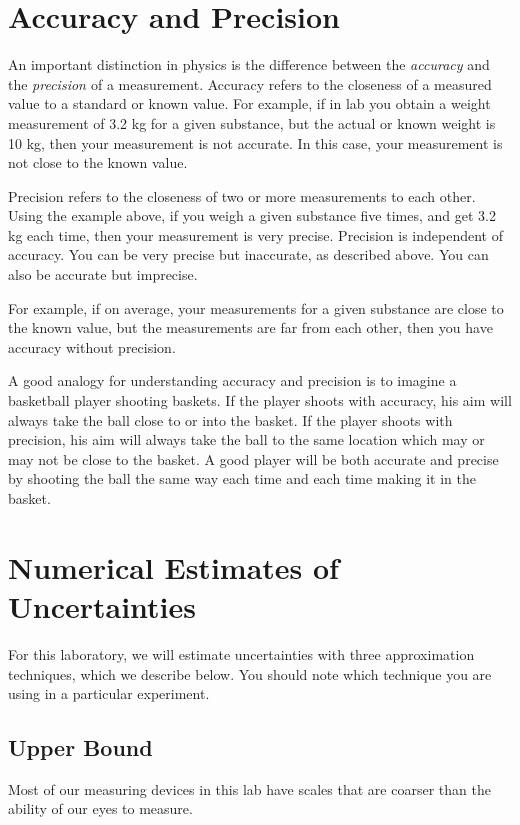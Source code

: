 \documentclass[letterpaper, 12pt]{book}
\newcommand{\myskip}{\vspace{0.5\baselineskip}}
\begin{document}
\section{Accuracy and Precision}
An important distinction in physics is the difference between the {\it{accuracy}} and the {\it{precision }} of a measurement.
Accuracy refers to the closeness of a measured value to a standard or known value. For example, if in lab you obtain a weight measurement of 3.2 kg for a given substance, but the actual or known weight is 10 kg, then your measurement is not accurate. In this case, your measurement is not close to the known value. \myskip

Precision refers to the closeness of two or more measurements to each other. Using the example above, if you weigh a given substance five times, and get 3.2 kg each time, then your measurement is very precise. Precision is independent of accuracy. You can be very precise but inaccurate, as described above. You can also be accurate but imprecise. \myskip

For example, if on average, your measurements for a given substance are close to the known value, but the measurements are far from each other, then you have accuracy without precision. \myskip

A good analogy for understanding accuracy and precision is to imagine a basketball player shooting baskets. If the player shoots with accuracy, his aim will always take the ball close to or into the basket. If the player shoots with precision, his aim will always take the ball to the same location which may or may not be close to the basket. A good player will be both accurate and precise by shooting the ball the same way each time and each time making it in the basket.
\section{Numerical Estimates of Uncertainties}

For this laboratory, we will estimate uncertainties with three approximation techniques, which we describe below. You should note which technique you are using in a particular experiment.

\subsection{Upper Bound}

Most of our measuring devices in this lab have scales that are coarser than the ability of our eyes to measure.
\end{document}
